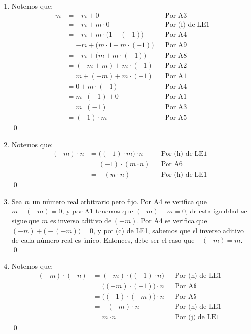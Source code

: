 \documentclass[11pt]{article}
\begin{document}
\begin{enumerate}[label=\alph*), font=\bfseries]
    \item Notemos que:
    \begin{align*}
        -m&=-m+0 && \text{Por A3} \\
        &=-m+m \cdot 0 && \text{Por (f) de LE1} \\
        &=-m+m \cdot  \bigl( 1+ \left( -1 \right)  \bigr) && \text{Por A4} \\
        &=-m+ \bigl( m \cdot 1+m \cdot  \left( -1 \right)  \bigr) && \text{Por A9} \\
        &=-m+ \bigl( m+m \cdot  \left( -1 \right)  \bigr) && \text{Por A8} \\
        &= \left( -m+m \right) +m \cdot  \left( -1 \right) && \text{Por A2} \\
        &=m+ \left( -m \right) +m \cdot  \left( -1 \right) && \text{Por A1} \\
        &=0+m \cdot  \left( -1 \right) && \text{Por A4} \\
        &=m \cdot  \left( -1 \right) + 0 && \text{Por A1} \\
        &=m \cdot  \left( -1 \right) && \text{Por A3} \\
        &= \left( -1 \right)  \cdot m && \text{Por A5}
    \end{align*} \qed
    
    \item Notemos que:
    \begin{align*}
        (-m) \cdot n &= \bigl( \left(-1 \right) \cdot m \bigr) \cdot n && \text{Por (h) de LE1}\\
        &= (-1) \cdot (m \cdot n) && \text{Por A6}\\
        &= -(m \cdot n) && \text{Por (h) de LE1}
    \end{align*} \qed

    \item Sea $m$ un número real arbitrario pero fijo. Por A4 se verifica que $m + (-m) = 0$, y por A1 tenemos que $(-m) + m = 0$, de esta igualdad se sigue que $m$ es inverso aditivo de $(-m)$. Por A4 se verifica que $(-m) + \bigl(-(-m)\bigr) = 0$, y por (c) de LE1, sabemos que el inverso aditivo de cada número real es único. Entonces, debe ser el caso que $-(-m) = m$.
    \qed

    \item Notemos que:
    \begin{align*}
        (-m) \cdot (-n) &= (-m) \cdot \bigl( (-1) \cdot n \bigr) && \text{Por (h) de LE1}\\
        &= \bigl( (-m) \cdot (-1) \bigr) \cdot n && \text{Por A6}\\
        &= \bigl( (-1) \cdot (-m) \bigr) \cdot n && \text{Por A5}\\
        &= -(-m) \cdot n && \text{Por (h) de LE1}\\
        &= m \cdot n && \text{Por (j) de LE1}
    \end{align*} \qed


\end{enumerate}
\end{document}
